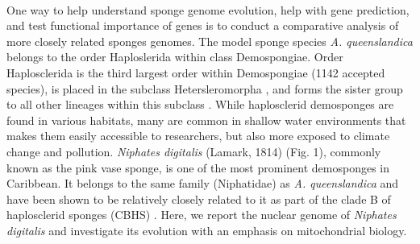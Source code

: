 \paragraph{}
One way to help understand sponge genome evolution, help with gene prediction, and test functional importance of genes is to conduct a comparative analysis of more closely related sponges genomes.
%
%
The model sponge species \textit{A. queenslandica} belongs to the order Haploslerida within class Demospongiae.
%
Order Haplosclerida is the third largest order within Demospongiae (1142 accepted species), is placed in the subclass Hetersleromorpha \citep{morrow2015a}, and forms the sister group to all other lineages within this subclass \citep{borchiellini2004,lavrov2008,simion2017}. 
%
While haplosclerid demosponges are found in various habitats, many are common in shallow water environments that makes them easily accessible to researchers, but also more exposed to climate change and pollution.
%
\textit{Niphates digitalis} (Lamark, 1814) (Fig. 1), commonly known as the pink vase sponge, is one of the most prominent demosponges in Caribbean. 
%
It belongs to the same family (Niphatidae) as \textit{A. queenslandica} and have been shown to be relatively closely related to it as part of the clade B of haplosclerid sponges (CBHS) \citep{redmond2011, redmond2013}.
%
Here, we report the nuclear genome of \textit{Niphates digitalis}  and investigate its evolution with an emphasis on mitochondrial biology. 
%
